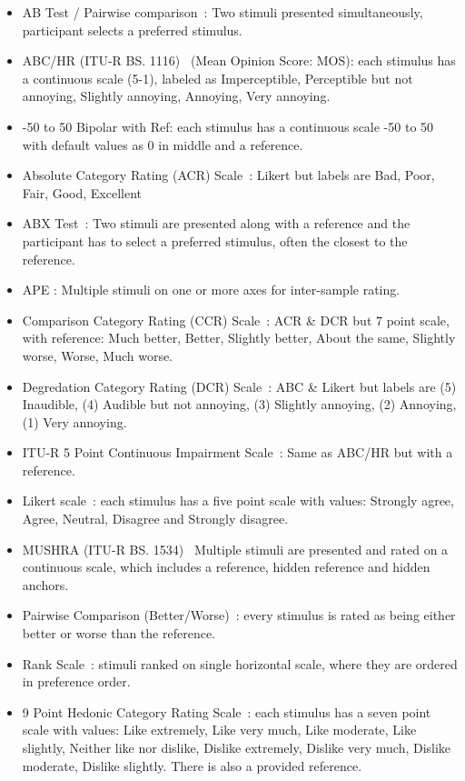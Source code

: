 \documentclass[11pt, oneside]{article}   	%
\begin{document}
		\begin{itemize}
			\item AB Test / Pairwise comparison~\cite{lipshitz1981great,david1963method}: Two stimuli presented simultaneously, participant selects a preferred stimulus.
			\item ABC/HR (ITU-R BS. 1116)~\cite{recommendation19971116} (Mean Opinion Score: MOS): each stimulus has a continuous scale (5-1), labeled as Imperceptible, Perceptible but not annoying, Slightly annoying, Annoying, Very annoying.
			\item -50 to 50 Bipolar with Ref: each stimulus has a continuous scale -50 to 50 with default values as 0 in middle and a reference.
			\item Absolute Category Rating (ACR) Scale~\cite{rec1996p}: Likert but labels are Bad, Poor, Fair, Good, Excellent 
			\item ABX Test~\cite{clark1982high}: Two stimuli are presented along with a reference and the participant has to select a preferred stimulus, often the closest to the reference.
			\item APE \cite{ape}: Multiple stimuli on one or more axes for inter-sample rating.
			\item Comparison Category Rating (CCR) Scale~\cite{rec1996p}: ACR \& DCR but 7 point scale, with reference: Much better, Better, Slightly better, About the same, Slightly worse, Worse, Much worse.
			\item Degredation Category Rating (DCR) Scale~\cite{rec1996p}: ABC \& Likert but labels are (5) Inaudible, (4) Audible but not annoying, (3) Slightly annoying, (2) Annoying, (1) Very annoying.
			\item ITU-R 5 Point Continuous Impairment Scale~\cite{rec1997bs}: Same as ABC/HR but with a reference.
			\item Likert scale~\cite{likert1932technique}: each stimulus has a five point scale with values: Strongly agree, Agree, Neutral, Disagree and Strongly disagree.
			\item MUSHRA (ITU-R BS. 1534)~\cite{recommendation20031534}  Multiple stimuli are presented and rated on a continuous scale, which includes a reference, hidden reference and hidden anchors.
			\item Pairwise Comparison (Better/Worse)~\cite{david1963method}: every stimulus is rated as being either better or worse than the reference.
			\item Rank Scale~\cite{pascoe1983evaluation}: stimuli ranked on single horizontal scale, where they are ordered in preference order.
			\item 9 Point Hedonic Category Rating Scale~\cite{peryam1952advanced}: each stimulus has a seven point scale with values: Like extremely, Like very much, Like moderate, Like slightly, Neither like nor dislike, Dislike extremely, Dislike very much, Dislike moderate, Dislike slightly. There is also a provided reference.
		\end{itemize}
\end{document}
